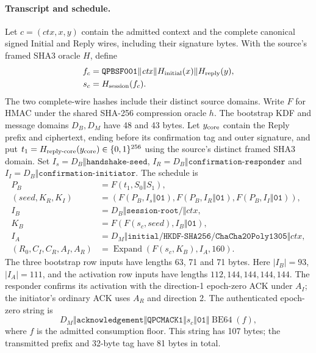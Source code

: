 \paragraph{Transcript and schedule.}
Let $c=(\mathit{ctx},x,y)$ contain the admitted context and the complete
canonical signed Initial and Reply wires, including their signature
bytes. With the source's framed SHA3 oracle $H$, define
\[
 \begin{split}
 f_c&=\mathtt{QPBSF001}\Vert\mathit{ctx}
       \Vert H_{\rm initial}(x)\Vert H_{\rm reply}(y),\\
 s_c&=H_{\rm session}(f_c).
 \end{split}
\]
The two complete-wire hashes include their distinct source domains.
Write $F$ for HMAC under the shared SHA-256 compression oracle $h$.
The bootstrap KDF and message domains $D_B,D_M$ have 48 and 43 bytes.
Let $y_{\rm core}$ contain the Reply prefix and ciphertext, ending before
its confirmation tag and outer signature, and put
$t_1=H_{\rm reply\text{-}core}(y_{\rm core})\in\{0,1\}^{256}$ using the
source's distinct framed SHA3 domain. Set
$I_s=D_B\Vert\texttt{handshake-seed}$,
$I_R=D_B\Vert\texttt{confirmation-responder}$ and
$I_I=D_B\Vert\texttt{confirmation-initiator}$.
The schedule is
\begin{equation}
 \begin{aligned}
 P_B&=F(t_1,S_0\Vert S_1),\\
 (\mathit{seed},K_R,K_I)&=
    (F(P_B,I_s\Vert\mathtt{01}),F(P_B,I_R\Vert\mathtt{01}),
       F(P_B,I_I\Vert\mathtt{01})),\\
 I_B&=D_B\Vert\texttt{session-root/}\Vert\mathit{ctx},\\
 K_B&=F(F(s_c,\mathit{seed}),I_B\Vert\mathtt{01}),\\
 I_A&=D_M\Vert\texttt{initial/HKDF-SHA256/ChaCha20Poly1305}
       \Vert\mathit{ctx},\\
 (R_0,C_I,C_R,A_I,A_R)&=
       \operatorname{Expand}(F(s_c,K_B),I_A,160).
 \end{aligned}
 \label{eq:bootstrap-schedule}
\end{equation}
The three bootstrap row inputs have lengths 63, 71 and 71 bytes.
Here $|I_B|=93$, $|I_A|=111$, and the activation row inputs have
lengths $112,144,144,144,144$. The responder confirms its activation
with the direction-1 epoch-zero ACK under $A_I$; the initiator's ordinary
ACK uses $A_R$ and direction 2. The authenticated epoch-zero string is
\[
 D_M\Vert\texttt{acknowledgement}\Vert\mathtt{QPCMACK1}
       \Vert s_c\Vert\mathtt{01}\Vert\operatorname{BE64}(f),
\]
where $f$ is the admitted consumption floor. This string has 107 bytes;
the transmitted prefix and 32-byte tag have 81 bytes in total.


